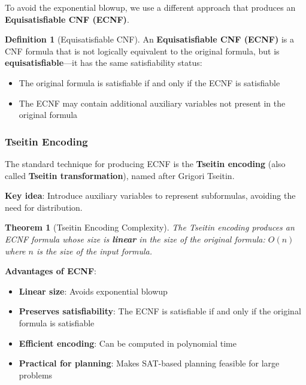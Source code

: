 \documentclass[11pt,a4paper]{article}
\theoremstyle{definition}
\newtheorem{definition}{Definition}[section]
\theoremstyle{plain}
\newtheorem{theorem}{Theorem}[section]
\theoremstyle{remark}
\begin{document}
To avoid the exponential blowup, we use a different approach that produces an \textbf{Equisatisfiable CNF (ECNF)}.

\begin{tcolorbox}[colback=green!5!white,colframe=green!75!black,title=\textbf{Equisatisfiable CNF (ECNF)}]
\begin{definition}[Equisatisfiable CNF]
An \textbf{Equisatisfiable CNF (ECNF)} is a CNF formula that is not logically equivalent to the original formula, but is \textbf{equisatisfiable}—it has the same satisfiability status:
\begin{itemize}
    \item The original formula is satisfiable if and only if the ECNF is satisfiable
    \item The ECNF may contain additional auxiliary variables not present in the original formula
\end{itemize}
\end{definition}
\end{tcolorbox}

\subsubsection{Tseitin Encoding}

The standard technique for producing ECNF is the \textbf{Tseitin encoding} (also called \textbf{Tseitin transformation}), named after Grigori Tseitin.

\textbf{Key idea}: Introduce auxiliary variables to represent subformulas, avoiding the need for distribution.

\begin{tcolorbox}[colback=purple!5!white,colframe=purple!75!black,title=\textbf{Tseitin Encoding Complexity}]
\begin{theorem}[Tseitin Encoding Complexity]
The Tseitin encoding produces an ECNF formula whose size is \textbf{linear} in the size of the original formula: $O(n)$ where $n$ is the size of the input formula.
\end{theorem}
\end{tcolorbox}

\textbf{Advantages of ECNF}:
\begin{itemize}
    \item \textbf{Linear size}: Avoids exponential blowup
    \item \textbf{Preserves satisfiability}: The ECNF is satisfiable if and only if the original formula is satisfiable
    \item \textbf{Efficient encoding}: Can be computed in polynomial time
    \item \textbf{Practical for planning}: Makes SAT-based planning feasible for large problems
\end{itemize}
\end{document}
